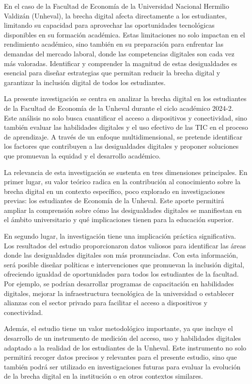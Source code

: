 \documentclass[12pt, a4paper]{article}
\begin{document}
En el caso de la Facultad de Economía de la Universidad Nacional Hermilio Valdizán (Unheval), la brecha digital afecta directamente a los estudiantes, limitando su capacidad para aprovechar las oportunidades tecnológicas disponibles en su formación académica. Estas limitaciones no solo impactan en el rendimiento académico, sino también en su preparación para enfrentar las demandas del mercado laboral, donde las competencias digitales son cada vez más valoradas. Identificar y comprender la magnitud de estas desigualdades es esencial para diseñar estrategias que permitan reducir la brecha digital y garantizar la inclusión digital de todos los estudiantes.

La presente investigación se centra en analizar la brecha digital en los estudiantes de la Facultad de Economía de la Unheval durante el ciclo académico 2024-2. Este análisis no solo busca cuantificar el acceso a dispositivos y conectividad, sino también evaluar las habilidades digitales y el uso efectivo de las TIC en el proceso de aprendizaje. A través de un enfoque multidimensional, se pretende identificar los factores que contribuyen a las desigualdades digitales y proponer soluciones que promuevan la equidad y el desarrollo académico.

La relevancia de esta investigación se sustenta en tres dimensiones principales. En primer lugar, su valor teórico radica en la contribución al conocimiento sobre la brecha digital en un contexto específico, poco explorado en investigaciones previas: los estudiantes de Economía de la Unheval. Este aporte permitirá ampliar la comprensión sobre cómo las desigualdades digitales se manifiestan en el ámbito universitario y qué implicaciones tienen para la educación superior.

En segundo lugar, la investigación tiene una implicación práctica significativa. Los resultados del estudio proporcionaron datos valiosos para identificar las áreas donde las desigualdades digitales son más pronunciadas. Con esta información, será posible diseñar políticas e intervenciones que promuevan la inclusión digital, ofreciendo igualdad de oportunidades para todos los estudiantes de la facultad. Por ejemplo, se podrían desarrollar programas de capacitación en habilidades digitales, mejorar la infraestructura tecnológica de la universidad o establecer alianzas con el sector privado para facilitar el acceso a dispositivos y conectividad.

Además, el estudio tiene un valor metodológico importante, ya que incluye el desarrollo de un instrumento de medición del acceso, uso y habilidades digitales adaptado a la realidad de los estudiantes de la Unheval. Este instrumento no solo permitirá recoger datos precisos y relevantes para el presente estudio, sino que también podrá ser utilizado en investigaciones futuras para evaluar la evolución de la brecha digital en la institución o en otros contextos similares.
\end{document}
